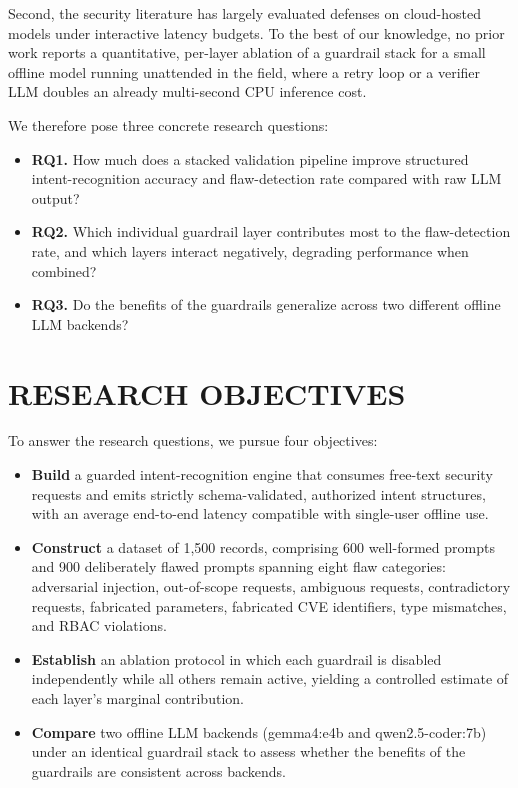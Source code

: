 \documentclass[a4paper,twoside]{article}
\begin{document}
Second, the security literature has largely evaluated defenses on cloud-hosted models under interactive latency budgets. To the best of our knowledge, no prior work reports a quantitative, per-layer ablation of a guardrail stack for a small offline model running unattended in the field, where a retry loop or a verifier LLM doubles an already multi-second CPU inference cost.

We therefore pose three concrete research questions:

\begin{itemize}
    \item \textbf{RQ1.} How much does a stacked validation pipeline improve structured intent-recognition accuracy and flaw-detection rate compared with raw LLM output?
    \item \textbf{RQ2.} Which individual guardrail layer contributes most to the flaw-detection rate, and which layers interact negatively, degrading performance when combined?
    \item \textbf{RQ3.} Do the benefits of the guardrails generalize across two different offline LLM backends?
\end{itemize}


\section{\uppercase{Research Objectives}}
\label{sec:objectives}

\noindent To answer the research questions, we pursue four objectives:

\begin{itemize}
    \item \textbf{Build} a guarded intent-recognition engine that consumes free-text security requests and emits strictly schema-validated, authorized intent structures, with an average end-to-end latency compatible with single-user offline use.
    \item \textbf{Construct} a dataset of 1,500 records, comprising 600 well-formed prompts and 900 deliberately flawed prompts spanning eight flaw categories: adversarial injection, out-of-scope requests, ambiguous requests, contradictory requests, fabricated parameters, fabricated CVE identifiers, type mismatches, and RBAC violations.
    \item \textbf{Establish} an ablation protocol in which each guardrail is disabled independently while all others remain active, yielding a controlled estimate of each layer's marginal contribution.
    \item \textbf{Compare} two offline LLM backends (gemma4:e4b and qwen2.5-coder:7b) under an identical guardrail stack to assess whether the benefits of the guardrails are consistent across backends.
\end{itemize}
\end{document}
